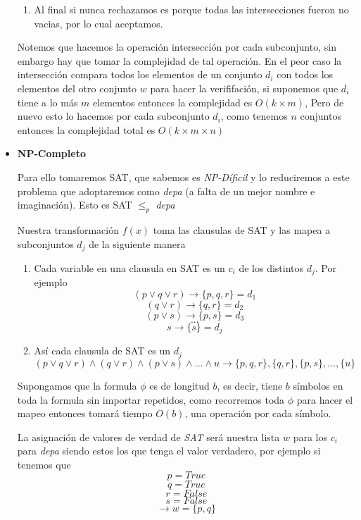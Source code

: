 \documentclass[12pt,letterpaper]{article}
\begin{document}
\begin{itemize}
\begin{enumerate}
        \item Al final si nunca rechazamos es porque todas las intersecciones fueron no vacias, por lo cual aceptamos.
    \end{enumerate}
    \newpage
    Notemos que hacemos la operación intersección por cada subconjunto, sin embargo hay que tomar la complejidad de tal operación. En el peor caso la intersección compara todos los elementos de un conjunto $d_i$ con todos los elementos del otro conjunto $w$ para hacer la verififación, si suponemos que $d_i$ tiene a lo más $m$ elementos entonces la complejidad es $O(k \times m)$, Pero de nuevo esto lo hacemos por cada subconjunto $d_i$, como tenemos $n$ conjuntos entonces la complejidad total es $O(k \times m \times n)$
    
    \item \textbf{NP-Completo}
    
    Para ello tomaremos SAT, que sabemos es \textit{NP-Díficil} y lo reduciremos a este problema que adoptaremos como \textit{depa} (a falta de un mejor nombre e imaginación). Esto es SAT $\leq_p$ \textit{depa} 
    
    Nuestra transformación $f(x)$ toma las clausulas de SAT y las mapea a subconjuntos $d_j$ de la siguiente manera
    \begin{enumerate}
        \item Cada variable en una clausula en SAT es un $c_i$ de los distintos $d_j$. Por ejemplo
        $$(p \vee q \vee r) \rightarrow \{p, q, r\} =d_1$$
        $$(q \vee r) \rightarrow \{q, r\} =d_2$$
        $$(p \vee s) \rightarrow \{p, s\} =d_3$$
        $$...$$
        $$ s \rightarrow \{s\} = d_j$$
        
        \item Así cada clausula de SAT es un $d_j$
        $$(p \vee q \vee r) \wedge (q \vee r) \wedge (p \vee s) \wedge ... \wedge u \rightarrow \{p, q, r\}, \{q, r\}, \{p, s\}, ..., \{u\}$$
    \end{enumerate}
    
    Supongamos que la formula $\phi$ es de longitud $b$, es decir, tiene $b$ símbolos en toda la formula sin importar repetidos, como recorremos toda $\phi$ para hacer el mapeo entonces tomará tiempo $O(b)$, una operación por cada símbolo.
    
    La asignación de valores de verdad de \textit{SAT} será nuestra lista $w$ para los $c_i$ para \textit{depa} siendo estos los que tenga el valor verdadero, por ejemplo si tenemos que 
    $$p = True$$
    $$q = True$$ 
    $$r = False$$ 
    $$s = False$$ 
    $$\rightarrow w = \{p,q\}$$
    

\end{itemize}
\end{document}
